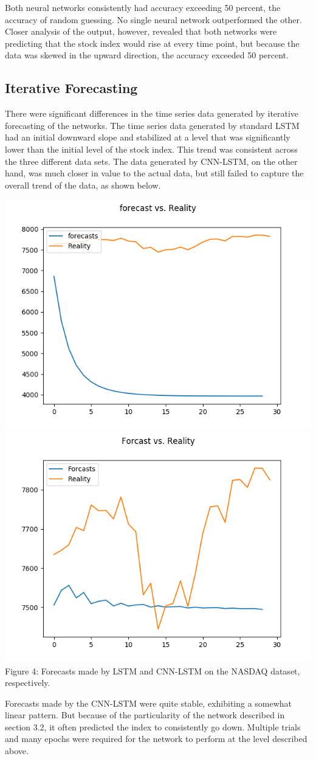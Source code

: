 \documentclass[12pt]{article}
\begin{document}
Both neural networks consistently had accuracy exceeding 50 percent, the accuracy of random guessing. No single neural network outperformed the other. Closer analysis of the output, however, revealed that both networks were predicting that the stock index would rise at every time point, but because the data was skewed in the upward direction, the accuracy exceeded 50 percent.

\subsection{Iterative Forecasting}
There were significant differences in the time series data generated by iterative forecasting of the networks. The time series data generated by standard LSTM had an initial downward slope and stabilized at a level that was significantly lower than the initial level of the stock index. This trend was consistent across the three different data sets. The data generated by CNN-LSTM, on the other hand, was much closer in value to the actual data, but still failed to capture the overall trend of the data, as shown below.

\begin{center}
\includegraphics[width = 0.45\linewidth]{Forecast_LSTM_Nasdaq.png} \includegraphics[width = 0.45\linewidth]{Forecast_CNN_Nasdaq_5YR.png}\\
Figure 4: Forecasts made by LSTM and CNN-LSTM on the NASDAQ dataset, respectively.
\end{center}


Forecasts made by the CNN-LSTM were quite stable, exhibiting a somewhat linear pattern. But because of the particularity of the network described in section 3.2, it often predicted the index to consistently go down. Multiple trials and many epochs were required for the network to perform at the level described above.
\end{document}

